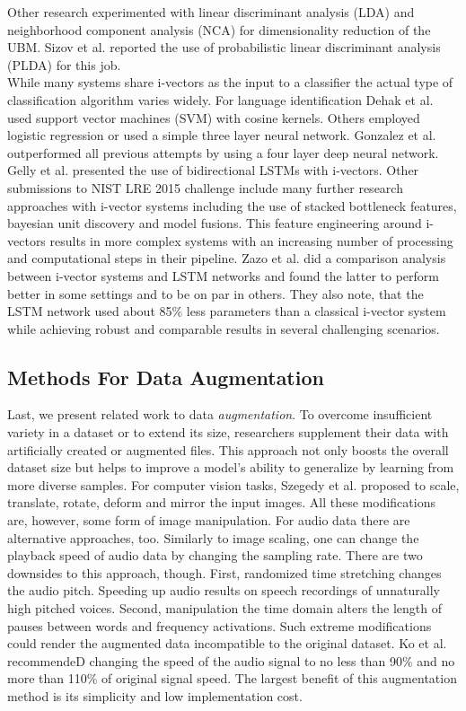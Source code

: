 Other research experimented with linear discriminant analysis (LDA) and neighborhood component analysis (NCA) for dimensionality reduction of the UBM.\cite{dehak2011front} Sizov et al. reported the use of probabilistic linear discriminant analysis (PLDA) for this job.\cite{sizov2016discriminating}\\
While many systems share i-vectors as the input to a classifier the actual type of classification algorithm varies widely. For language identification Dehak et al. used support vector machines (SVM) with cosine kernels.\cite{dehak2011front} Others employed logistic regression\cite{martinez2011language} or used a simple three layer neural network\cite{plchot2016bat}. Gonzalez et al. outperformed all previous attempts by using a four layer deep neural network.\cite{gonzalez2015frame} Gelly et al. presented the use of bidirectional LSTMs with i-vectors.\cite{gelly2016language} Other submissions to NIST LRE 2015 challenge\cite{lre2015} include many further research approaches with i-vector systems including the use of stacked bottleneck features, bayesian unit discovery and model fusions.\cite{lee20162015, torres2008mitll, ng2016sheffield} This feature engineering around i-vectors results in more complex systems with an increasing number of processing and computational steps in their pipeline. Zazo et al. did a comparison analysis between i-vector systems and LSTM networks and found the latter to perform better in some settings and to be on par in others.\cite{zazo2016evaluation} They also note, that the LSTM network used about 85\% less parameters than a classical i-vector system while achieving robust and comparable results in several challenging scenarios.

\subsection{Methods For Data Augmentation}
Last, we present related work to data \emph{augmentation}. To overcome insufficient variety in a dataset or to extend its size, researchers supplement their data with artificially created or augmented files. This approach not only boosts the overall dataset size but helps to improve a model's ability to generalize by learning from more diverse samples. For computer vision tasks, Szegedy et al. proposed to scale, translate, rotate, deform and mirror the input images.\cite{szegedy2015going} All these modifications are, however, some form of image manipulation. For audio data there are alternative approaches, too. Similarly to image scaling, one can change the playback speed of audio data by changing the sampling rate. There are two downsides to this approach, though. First, randomized time stretching changes the audio pitch. Speeding up audio results on speech recordings of unnaturally high pitched voices. Second, manipulation the time domain alters the length of pauses between words and frequency activations. Such extreme modifications could render the augmented data incompatible to the original dataset. Ko et al. recommendeD changing the speed of the audio signal to no less than 90\% and no more than 110\% of original signal speed.\cite{ko2015audio} The largest benefit of this augmentation method is its simplicity and low implementation cost.

